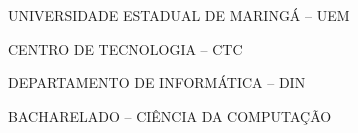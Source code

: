 

\renewcommand{\imprimircapa}{%
	\begin{capa}%
		\center

		{\fontseries{b}\selectfont\MakeTextUppercase{UNIVERSIDADE ESTADUAL DE MARINGÁ -- UEM}}
		
		{\fontseries{b}\selectfont\MakeTextUppercase{CENTRO DE TECNOLOGIA -- CTC}}

        {\fontseries{b}\selectfont\MakeTextUppercase{DEPARTAMENTO DE INFORMÁTICA -- DIN}}
		
		{\fontseries{b}\selectfont\MakeTextUppercase{BACHARELADO -- CIÊNCIA DA COMPUTAÇÃO  }}
		
		\vfill
		
		{\fontseries{b}\selectfont\MakeTextUppercase{\normalsize\imprimirautor}}
		
		\vfill
		\begin{center}
			{\fontseries{b}\selectfont\MakeTextUppercase{\imprimirtitulo}}
		\end{center}
		\vfill
		
		\vfill
		
		{\fontseries{b}\selectfont\MakeTextUppercase{\imprimirlocal}}
		\par
		{\selectfont \imprimirdata}
		\vspace*{1cm}
	\end{capa}
}

\imprimircapa				%